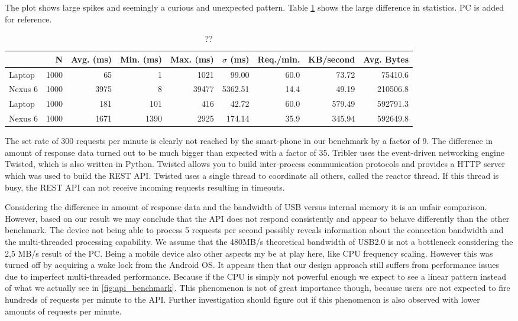The plot shows large spikes and seemingly a curious and unexpected pattern.
Table \ref{table:api_benchmark} shows the large difference in statistics.
PC is added for reference.
\begin{table}
  \begin{tabular}{l | *{8}{r}} \hline
  	 & N & Avg. (ms) & Min. (ms) & Max. (ms) & $\sigma$ (ms) & Req./min. & KB/second & Avg. Bytes \\ \hline \hline
  	 Laptop   & 1000 & 65     & 1       & 1021 & 99.00 & 60.0 & 73.72 & 75410.6 \\ \hline
  	 Nexus 6 & 1000 & 3975 & 8       & 39477 & 5362.51 & 14.4 & 49.19 & 210506.8 \\ \hline
  	 Laptop   & 1000 & 181   & 101   & 416   & 42.72   & 60.0 & 579.49 & 592791.3 \\ \hline
  	 Nexus 6 & 1000 & 1671 & 1390 & 2925 & 174.14 & 35.9 & 345.94 & 592649.8 \\ \hline
  \end{tabular}
  \caption{??}
  \label{table:api_benchmark}
\end{table}
The set rate of 300 requests per minute is clearly not reached by the smart-phone in our benchmark by a factor of 9.
The difference in amount of response data turned out to be much bigger than expected with a factor of 35.
Tribler uses the event-driven networking engine Twisted, which is also written in Python.
Twisted allows you to build inter-process communication protocols and provides a HTTP server which was used to build the REST API.
Twisted uses a single thread to coordinate all others, called the reactor thread.
If this thread is busy, the REST API can not receive incoming requests resulting in timeouts.

Considering the difference in amount of response data and the bandwidth of USB versus internal memory it is an unfair comparison.
However, based on our result we may conclude that the API does not respond consistently and appear to behave differently than the other benchmark.
The device not being able to process 5 requests per second possibly reveals information about the connection bandwidth and the multi-threaded processing capability.
We assume that the 480MB/s theoretical bandwidth of USB2.0 is not a bottleneck considering the 2,5 MB/s result of the PC.
Being a mobile device also other aspects my be at play here, like CPU frequency scaling.
However this was turned off by acquiring a wake lock from the Android OS.
It appears then that our design approach still suffers from performance issues due to imperfect multi-threaded performance.
Because if the CPU is simply not powerful enough we expect to see a linear pattern instead of what we actually see in \ref{fig:api_benchmark}.
This phenomenon is not of great importance though, because users are not expected to fire hundreds of requests per minute to the API.
Further investigation should figure out if this phenomenon is also observed with lower amounts of requests per minute.


